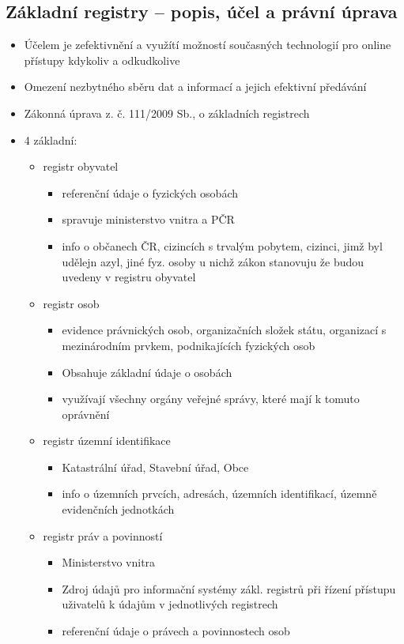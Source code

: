 \subsection{Základní registry -- popis, účel a právní úprava}
\begin{itemize}
    \item  Účelem je zefektivnění a využítí možností současných technologií pro online přístupy kdykoliv a odkudkolive
    \item Omezení nezbytného sběru dat a informací a jejich efektivní předávání
    \item Zákonná úprava z. č. 111/2009 Sb., o základních registrech
    \item 4 základní:
    \begin{itemize}
        \item registr obyvatel\begin{itemize}
            \item referenční údaje o fyzických osobách
            \item spravuje ministerstvo vnitra a PČR
            \item info o občanech ČR, cizincích s trvalým pobytem, cizinci, jimž byl udělejn azyl, jiné fyz. osoby u nichž zákon stanovuju že budou uvedeny v registru obyvatel
        \end{itemize} 
        \item registr osob \begin{itemize}
            \item  evidence právnických osob, organizačních složek státu, organizací s mezinárodním prvkem, podnikajících fyzických osob
            \item Obsahuje základní údaje o osobách
            \item využívají všechny orgány veřejné správy, které mají k tomuto oprávnění
        \end{itemize}
        \item registr územní identifikace\begin{itemize}
            \item Katastrální úřad, Stavební úřad, Obce
            \item info o územních prvcích, adresách, územních identifikací, územně evidenčních jednotkách
        \end{itemize}
        \item registr práv a povinností \begin{itemize}
            \item Ministerstvo vnitra
            \item Zdroj údajů pro informační systémy zákl. registrů při řízení přístupu uživatelů k údajům v jednotlivých registrech
            \item referenční údaje o právech a povinnostech osob
        \end{itemize}
    \end{itemize}
\end{itemize}

